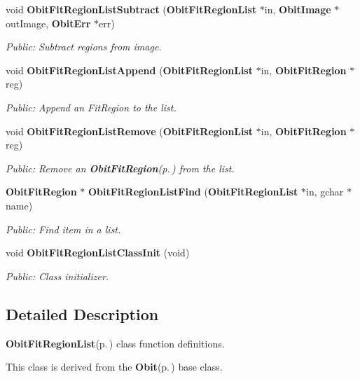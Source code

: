 \begin{CompactItemize}
void {\bf Obit\-Fit\-Region\-List\-Subtract} ({\bf Obit\-Fit\-Region\-List} $\ast$in, {\bf Obit\-Image} $\ast$out\-Image, {\bf Obit\-Err} $\ast$err)
\begin{CompactList}\small\item\em Public: Subtract regions from image. \item\end{CompactList}\item 
void {\bf Obit\-Fit\-Region\-List\-Append} ({\bf Obit\-Fit\-Region\-List} $\ast$in, {\bf Obit\-Fit\-Region} $\ast$reg)
\begin{CompactList}\small\item\em Public: Append an Fit\-Region to the list. \item\end{CompactList}\item 
void {\bf Obit\-Fit\-Region\-List\-Remove} ({\bf Obit\-Fit\-Region\-List} $\ast$in, {\bf Obit\-Fit\-Region} $\ast$reg)
\begin{CompactList}\small\item\em Public: Remove an {\bf Obit\-Fit\-Region}{\rm (p.\,\pageref{structObitFitRegion})} from the list. \item\end{CompactList}\item 
{\bf Obit\-Fit\-Region} $\ast$ {\bf Obit\-Fit\-Region\-List\-Find} ({\bf Obit\-Fit\-Region\-List} $\ast$in, gchar $\ast$name)
\begin{CompactList}\small\item\em Public: Find item in a list. \item\end{CompactList}\item 
void {\bf Obit\-Fit\-Region\-List\-Class\-Init} (void)
\begin{CompactList}\small\item\em Public: Class initializer. \item\end{CompactList}\end{CompactItemize}


\subsection{Detailed Description}
{\bf Obit\-Fit\-Region\-List}{\rm (p.\,\pageref{structObitFitRegionList})} class function definitions. 

This class is derived from the {\bf Obit}{\rm (p.\,\pageref{structObit})} base class.


